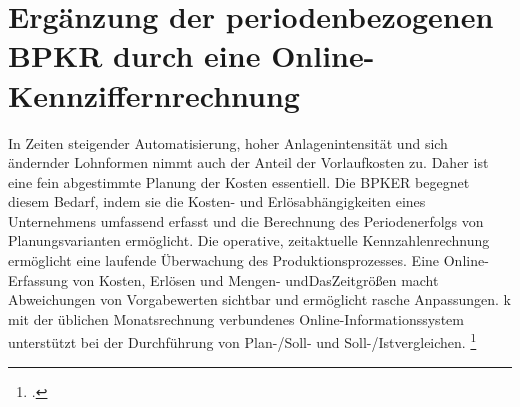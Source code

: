 \section{Ergänzung der periodenbezogenen BPKR durch eine Online-Kennziffernrechnung}

In Zeiten steigender Automatisierung, hoher Anlagenintensität und sich ändernder Lohnformen nimmt auch der Anteil der Vorlaufkosten zu. Daher ist eine fein abgestimmte Planung der Kosten essentiell. Die BPKER begegnet diesem Bedarf, indem sie die Kosten- und Erlösabhängigkeiten eines Unternehmens umfassend erfasst und die Berechnung des Periodenerfolgs von Planungsvarianten ermöglicht. Die operative, zeitaktuelle Kennzahlenrechnung ermöglicht eine laufende Überwachung des Produktionsprozesses. Eine Online-Erfassung von Kosten, Erlösen und Mengen- undDasZeitgrö{\ss}en macht Abweichungen von Vorgabewerten sichtbar und ermöglicht rasche Anpassungen. k mit der üblichen Monatsrechnung verbundenes Online-Informationssystem unterstützt bei der Durchführung von Plan-/Soll- und Soll-/Istvergleichen. \footcite[Vgl.][S. 310ff]{Artikel_orginal}

